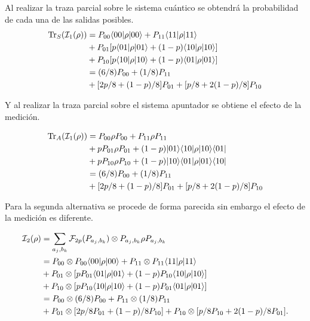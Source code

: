 Al realizar la traza parcial sobre le sistema cuántico se obtendrá la probabilidad de cada una de las salidas posibles.
\begin{equation}\label{traza_S1_ejemplo1}
    \begin{split}
        {\rm Tr}_S(\mathcal{I}_1(\rho)) &= P_{00} \langle 00|\rho|00\rangle + P_{11} \langle 11|\rho|11\rangle\\
        &+P_{01}[p \langle 01|\rho|01\rangle+(1-p)\langle 10|\rho|10\rangle]\\
        &+P_{10}[p \langle 10|\rho|10\rangle+(1-p)\langle 01|\rho|01\rangle]\\
        &=(6/8)P_{00} + (1/8)P_{11}\\
        &+[2p/8 +(1-p)/8]P_{01}+ [p/8+2(1-p)/8]P_{10}\\
    \end{split}
\end{equation}

Y al realizar la traza parcial sobre el sistema apuntador se obtiene el efecto de la medición.

\begin{equation}\label{traza_A1_ejemplo1}
    \begin{split}
        {\rm Tr}_A(\mathcal{I}_1(\rho)) &= P_{00} \rho P_{00} + P_{11}\rho P_{11}\\
        &+p P_{01}\rho P_{01}+(1-p) |01\rangle \langle 10|\rho|10\rangle \langle01|\\
        &+p P_{10}\rho P_{10}+(1-p) |10\rangle \langle 01|\rho|01\rangle \langle10|\\
        &=(6/8)P_{00} + (1/8)P_{11}\\
        &+[2p/8 +(1-p)/8]P_{01}+ [p/8+2(1-p)/8]P_{10}\\
    \end{split}
\end{equation}


Para la segunda alternativa se procede de forma parecida sin embargo el efecto de la medición es diferente.


\begin{equation}\label{segunda_alternativa_ejemplo1}
    \begin{split}
        \mathcal{I}_2(\rho)&=\sum_{a_j,b_k}\mathcal{F}_{2p}(P_{a_j,b_k})\otimes P_{a_j,b_k} \rho P_{a_j,b_k}\\
        &=P_{00}\otimes P_{00} \langle 00|\rho|00\rangle + P_{11}\otimes P_{11} \langle 11|\rho|11\rangle\\
        &+P_{01} \otimes [pP_{01} \langle 01|\rho|01\rangle+(1-p)P_{10}\langle 10|\rho|10\rangle]\\
        &+P_{10} \otimes [p P_{10}\langle 10|\rho|10\rangle+(1-p)P_{01}\langle 01|\rho|01\rangle]\\
        &=P_{00}\otimes (6/8)P_{00} + P_{11}\otimes (1/8)P_{11}\\
        &+   P_{01} \otimes [2p/8P_{01} +(1-p)/8P_{10}]+P_{10} \otimes[p/8 P_{10}+2(1-p)/8 P_{01}].\\
    \end{split}
\end{equation}


